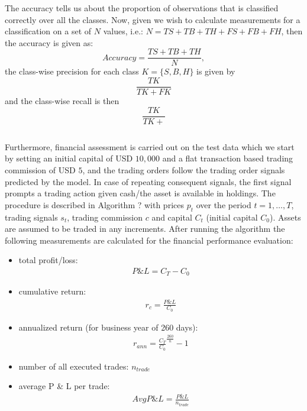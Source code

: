 \documentclass[11pt, a4paper]{article}
\begin{document}
The accuracy tells us about the proportion of observations that is classified correctly over all the classes. Now, given we wish to calculate measurements for a classification on a set of $N$ values, i.e.: $N = TS + TB + TH + FS + FB + FH$, then the accuracy is given as:
\begin{equation}
    \label{eq:acc}
    Accuracy = \frac{TS + TB + TH}{N},
\end{equation}
the class-wise precision for each class $K = \{S, B, H\}$ is given by
\begin{equation}
    \label{eq:pr}
    \frac{TK}{TK + FK}
\end{equation}
and the class-wise recall is then 
\begin{equation}
    \label{eq:rec}
    \frac{TK}{TK + }
\end{equation}

\begin{equation}
    \label{eq:f1}
\end{equation}

Furthermore, financial assessment is carried out on the test data which we start by setting an initial capital of USD $10,000$ and a flat transaction based trading commission of USD $5$, and the trading orders follow the trading order signals predicted by the model.
In case of repeating consequent signals, the first signal prompts a trading action given cash/the asset is available in holdings. 
The procedure is described in Algorithm ? with prices $p_t$ over the period $t=1, \dots, T$, trading signals $s_t$, trading commission $c$ and capital $C_t$ (initial capital $C_0$). Assets are assumed to be traded in any increments. After running the algorithm the following measurements are calculated for the financial performance evaluation:

\begin{itemize}
    \item total profit/loss: 
    \begin{align}
        \label{eq:totPL}
            P\& L = C_T - C_0
    \end{align}
    \item cumulative return: 
    \begin{align}
        \label{eq:cumret}
            r_c = \frac{P \& L}{C_0}
    \end{align}
    \item annualized return (for business year of 260 days): 
    \begin{align}
        \label{eq:annualized}
            r_{ann} = \frac{C_T}{C_0}^{\frac{260}{n}}-1
    \end{align}
    \item number of all executed trades: $n_{trade}$
    \item average P \& L per trade:
    \begin{align}
        \label{eq:avgpl}
        AvgP \& L = \frac{P \& L}{n_{trade}}
    \end{align}
\end{itemize}
\end{document}
